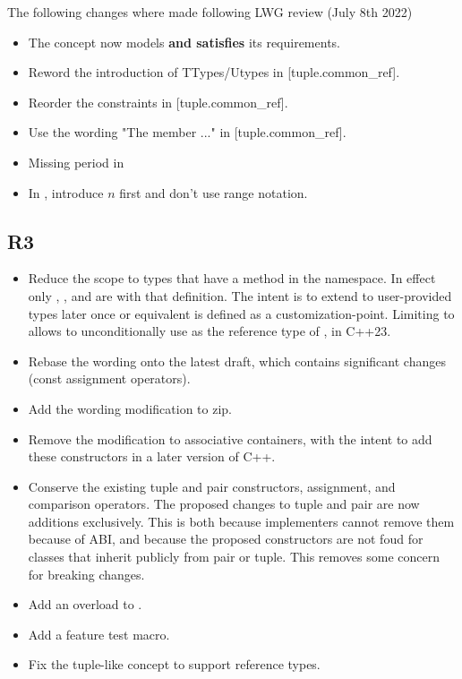 \documentclass{wg21}
\begin{document}
The following changes where made following LWG review (July 8th 2022)

\begin{itemize}
\item The  concept now models \textbf{and satisfies} its requirements.
\item Reword the introduction of TTypes/Utypes in [tuple.common_ref].
\item Reorder the constraints in [tuple.common_ref].
\item Use the wording "The member  ..." in [tuple.common_ref].
\item Missing period in 
\item In , introduce $n$ first and don't use range notation.

\end{itemize}

\subsection{R3}
\begin{itemize}
\item Reduce the scope to types that have a  method in the  namespace.
In effect only , ,  and  are 
with that definition.
The intent is to extend to user-provided types later once  or equivalent is defined as a customization-point.
Limiting to  allows to unconditionally use  as the reference type of ,  in C++23.
\item Rebase the wording onto the latest draft, which contains significant changes (const assignment operators).
\item Add the wording modification to zip.
\item Remove the modification to associative containers, with the intent to add these constructors in a later version of C++.
\item Conserve the existing tuple and pair constructors, assignment, and comparison operators. The proposed changes to tuple and pair are now additions exclusively. This is both because implementers cannot remove them because of ABI, and because the proposed constructors are not foud for classes that inherit publicly from pair or tuple. This removes some concern for breaking changes.
\item Add an overload to .
\item Add a feature test macro.
\item Fix the tuple-like concept to support reference types.
\end{itemize}
\end{document}
